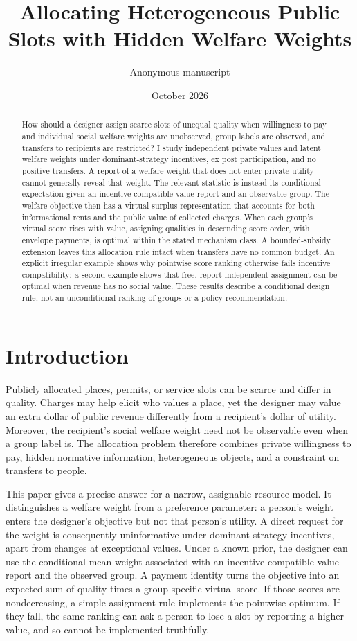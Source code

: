 \documentclass[11pt]{article}
\title{Allocating Heterogeneous Public Slots with Hidden Welfare Weights}
\author{Anonymous manuscript}
\date{October 2026}
\begin{document}
\maketitle

\begin{abstract}
How should a designer assign scarce slots of unequal quality when willingness to pay and individual social welfare weights are unobserved, group labels are observed, and transfers to recipients are restricted? I study independent private values and latent welfare weights under dominant-strategy incentives, ex post participation, and no positive transfers. A report of a welfare weight that does not enter private utility cannot generally reveal that weight. The relevant statistic is instead its conditional expectation given an incentive-compatible value report and an observable group. The welfare objective then has a virtual-surplus representation that accounts for both informational rents and the public value of collected charges. When each group's virtual score rises with value, assigning qualities in descending score order, with envelope payments, is optimal within the stated mechanism class. A bounded-subsidy extension leaves this allocation rule intact when transfers have no common budget. An explicit irregular example shows why pointwise score ranking otherwise fails incentive compatibility; a second example shows that free, report-independent assignment can be optimal when revenue has no social value. These results describe a conditional design rule, not an unconditional ranking of groups or a policy recommendation.
\end{abstract}

\section{Introduction}

Publicly allocated places, permits, or service slots can be scarce and differ in quality. Charges may help elicit who values a place, yet the designer may value an extra dollar of public revenue differently from a recipient's dollar of utility. Moreover, the recipient's social welfare weight need not be observable even when a group label is. The allocation problem therefore combines private willingness to pay, hidden normative information, heterogeneous objects, and a constraint on transfers to people.

This paper gives a precise answer for a narrow, assignable-resource model. It distinguishes a welfare weight from a preference parameter: a person's weight enters the designer's objective but not that person's utility. A direct request for the weight is consequently uninformative under dominant-strategy incentives, apart from changes at exceptional values. Under a known prior, the designer can use the conditional mean weight associated with an incentive-compatible value report and the observed group. A payment identity turns the objective into an expected sum of quality times a group-specific virtual score. If those scores are nondecreasing, a simple assignment rule implements the pointwise optimum. If they fall, the same ranking can ask a person to lose a slot by reporting a higher value, and so cannot be implemented truthfully.
\end{document}
